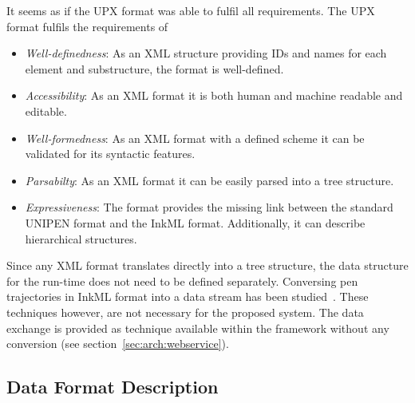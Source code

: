 It seems as if the UPX format was able to fulfil all requirements.
The UPX format fulfils the requirements of
\begin{itemize}
  \item \emph{Well-definedness}: As an XML structure providing IDs and names for 
        each element and substructure, the format is well-defined.

  \item \emph{Accessibility}: As an XML format it is both human and machine
        readable and editable.

  \item \emph{Well-formedness}: As an XML format with a defined scheme it can
        be validated for its syntactic features.

  \item \emph{Parsabilty}: As an XML format it can be easily parsed into a
        tree structure.

  \item \emph{Expressiveness}: The format provides the missing link between the
        standard UNIPEN format and the InkML format. Additionally, it can 
        describe hierarchical structures.
\end{itemize}
Since any XML format translates directly into a tree structure, the data 
structure for the run-time does not need to be defined separately.
Conversing pen trajectories in InkML format into a data stream has been 
studied~. These techniques however, are not necessary 
for the proposed system. The data exchange is provided as technique available
within the framework without any conversion (see 
section~\ref{sec:arch:webservice}).

\subsection{Data Format Description}
\label{sec:hwre:dataformatdescription}




